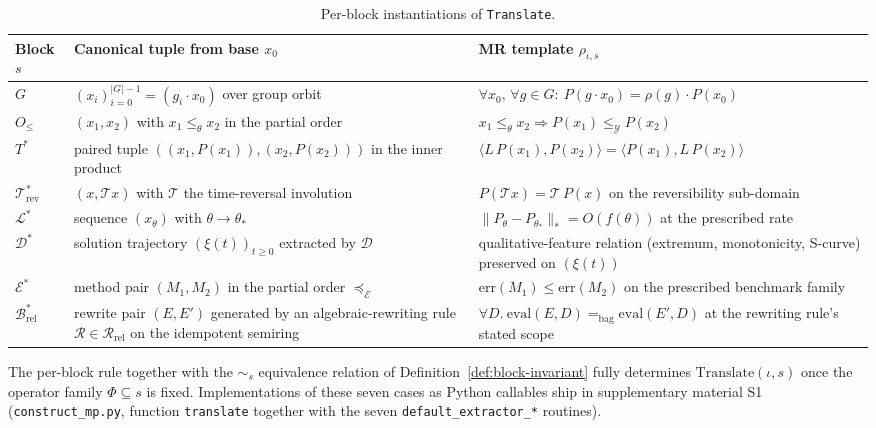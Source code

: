 \documentclass[manuscript]{acmart}
\begin{document}
\begin{table}[h]
\centering
\caption{Per-block instantiations of \texttt{Translate}.}
\label{tab:translate}
\footnotesize
\begin{tabular}{p{} p{} p{}}
\toprule
\textbf{Block} $s$ & \textbf{Canonical tuple from base $x_0$} & \textbf{MR template $\rho_{\iota,s}$} \\
\midrule
$G$ & $(x_i)_{i=0}^{|G|-1} = (g_i \cdot x_0)$ over group orbit & $\forall x_0,\, \forall g \in G:\ P(g\cdot x_0) = \rho(g)\cdot P(x_0)$ \\
$O_{\le}$ & $(x_1, x_2)$ with $x_1 \le_{\theta} x_2$ in the partial order & $x_1 \le_\theta x_2 \Rightarrow P(x_1) \le_{\mathcal{Y}} P(x_2)$ \\
$T^{*}$ & paired tuple $((x_1, P(x_1)), (x_2, P(x_2)))$ in the inner product & $\langle L\,P(x_1), P(x_2)\rangle = \langle P(x_1), L\,P(x_2)\rangle$ \\
$\mathcal{T}^{*}_{\mathrm{rev}}$ & $(x, \mathcal{T} x)$ with $\mathcal{T}$ the time-reversal involution & $P(\mathcal{T} x) = \mathcal{T}\,P(x)$ on the reversibility sub-domain \\
$\mathcal{L}^{*}$ & sequence $(x_\theta)$ with $\theta \to \theta_*$ & $\|P_{\theta} - P_{\theta_*}\|_{*} = O(f(\theta))$ at the prescribed rate \\
$\mathcal{D}^{*}$ & solution trajectory $(\xi(t))_{t \ge 0}$ extracted by $\mathcal{D}$ & qualitative-feature relation (extremum, monotonicity, S-curve) preserved on $(\xi(t))$ \\
$\mathcal{E}^{*}$ & method pair $(M_1, M_2)$ in the partial order $\preceq_{\mathcal{E}}$ & $\mathrm{err}(M_1) \le \mathrm{err}(M_2)$ on the prescribed benchmark family \\
$\mathcal{B}^{*}_{\mathrm{rel}}$ & rewrite pair $(E, E')$ generated by an algebraic-rewriting rule $\mathcal{R} \in \mathcal{R}_{\mathrm{rel}}$ on the idempotent semiring & $\forall D.\ \mathrm{eval}(E, D) =_{\mathrm{bag}} \mathrm{eval}(E', D)$ at the rewriting rule's stated scope \\
\bottomrule
\end{tabular}
\end{table}

The per-block rule together with the $\sim_s$ equivalence relation of Definition~\ref{def:block-invariant} fully determines $\mathrm{Translate}(\iota, s)$ once the operator family $\Phi \subseteq s$ is fixed. Implementations of these seven cases as Python callables ship in supplementary material S1 (\texttt{construct\_mp.py}, function \texttt{translate} together with the seven \texttt{default\_extractor\_*} routines).
\end{document}
